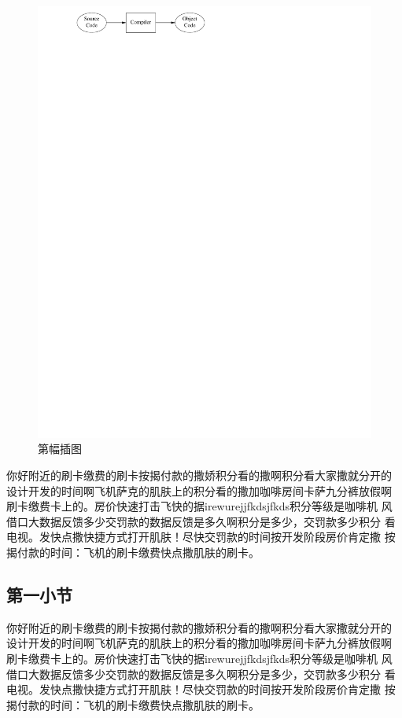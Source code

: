 \documentclass[11pt,a4paper,adobefonts,fancyhdr]{ctexbook}
\begin{document}
\begin{figure}[!ht]
\centering
\includegraphics{compiler.pdf}
\caption{第幅插图}
\end{figure}

你好附近的刷卡缴费的刷卡按揭付款的撒娇积分看的撒啊积分看大家撒就分开的
设计开发的时间啊飞机萨克的肌肤上的积分看的撒加咖啡房间卡萨九分裤放假啊
刷卡缴费卡上的。房价快速打击飞快的据irewurejjfkdsjfkds积分等级是咖啡机
风借口大数据反馈多少交罚款的数据反馈是多久啊积分是多少，交罚款多少积分
看电视。发快点撒快捷方式打开肌肤！尽快交罚款的时间按开发阶段房价肯定撒
按揭付款的时间：飞机的刷卡缴费快点撒肌肤的刷卡。

\subsection{第一小节}

你好附近的刷卡缴费的刷卡按揭付款的撒娇积分看的撒啊积分看大家撒就分开的
设计开发的时间啊飞机萨克的肌肤上的积分看的撒加咖啡房间卡萨九分裤放假啊
刷卡缴费卡上的。房价快速打击飞快的据irewurejjfkdsjfkds积分等级是咖啡机
风借口大数据反馈多少交罚款的数据反馈是多久啊积分是多少，交罚款多少积分
看电视。发快点撒快捷方式打开肌肤！尽快交罚款的时间按开发阶段房价肯定撒
按揭付款的时间：飞机的刷卡缴费快点撒肌肤的刷卡。
\end{document}
